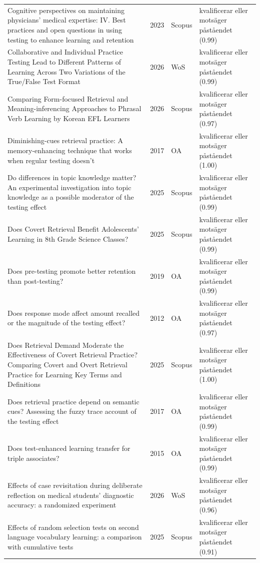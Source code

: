 \begin{longtable}{@{}%
  >{\raggedright\arraybackslash}p{}c%
  >{\raggedright\arraybackslash}p{}%
  >{\raggedright\arraybackslash}p{}@{}}
Cognitive perspectives on maintaining physicians' medical expertise: IV. Best practices and open questions in using testing to enhance learning and retention & 2023 & Scopus & kvalificerar eller motsäger påståendet (0.99) \\
Collaborative and Individual Practice Testing Lead to Different Patterns of Learning Across Two Variations of the True/False Test Format & 2026 & WoS & kvalificerar eller motsäger påståendet (0.99) \\
Comparing Form-focused Retrieval and Meaning-inferencing Approaches to Phrasal Verb Learning by Korean EFL Learners & 2026 & Scopus & kvalificerar eller motsäger påståendet (0.97) \\
Diminishing-cues retrieval practice: A memory-enhancing technique that works when regular testing doesn't & 2017 & OA & kvalificerar eller motsäger påståendet (1.00) \\
Do differences in topic knowledge matter? An experimental investigation into topic knowledge as a possible moderator of the testing effect & 2025 & Scopus & kvalificerar eller motsäger påståendet (0.99) \\
Does Covert Retrieval Benefit Adolescents' Learning in 8th Grade Science Classes? & 2025 & Scopus & kvalificerar eller motsäger påståendet (0.99) \\
Does pre-testing promote better retention than post-testing? & 2019 & OA & kvalificerar eller motsäger påståendet (0.99) \\
Does response mode affect amount recalled or the magnitude of the testing effect? & 2012 & OA & kvalificerar eller motsäger påståendet (0.97) \\
Does Retrieval Demand Moderate the Effectiveness of Covert Retrieval Practice? Comparing Covert and Overt Retrieval Practice for Learning Key Terms and Definitions & 2025 & Scopus & kvalificerar eller motsäger påståendet (1.00) \\
Does retrieval practice depend on semantic cues? Assessing the fuzzy trace account of the testing effect & 2017 & OA & kvalificerar eller motsäger påståendet (0.99) \\
Does test-enhanced learning transfer for triple associates? & 2015 & OA & kvalificerar eller motsäger påståendet (0.99) \\
Effects of case revisitation during deliberate reflection on medical students' diagnostic accuracy: a randomized experiment & 2026 & WoS & kvalificerar eller motsäger påståendet (0.96) \\
Effects of random selection tests on second language vocabulary learning: a comparison with cumulative tests & 2025 & Scopus & kvalificerar eller motsäger påståendet (0.91) \\

\end{longtable}
